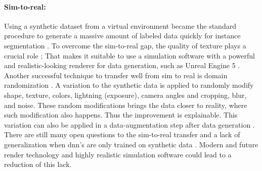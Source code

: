 		\paragraph{Sim-to-real:} Using a synthetic dataset from a virtual environment became the standard procedure to generate a massive amount of labeled data quickly for instance segmentation \cite{Danielczuk2019}\cite{Xie2020}\cite{Xie2021}\cite{Shao2018}\cite{Toda2019}. To overcome the sim-to-real gap, the quality of texture plays a crucial role \cite{Tabak2023}\cite{Martinez2019}; That makes it suitable to use a simulation software with a powerful and realistic-looking renderer for data generation, such as Unreal Engine 5 \cite{Romero2022}.\\
		Another successful technique to transfer well from sim to real is domain randomization \cite{Raj2023}. A variation to the synthetic data is applied to randomly modify shape, texture, colors, lightning (exposure), camera angles and cropping, blur, and noise. These random modifications brings the data closer to reality, where such modification also happens. Thus the improvement is explainable. This variation can also be applied in a data-augmentation step after data generation \cite{Kar2022}.\\
		There are still many open questions to the sim-to-real transfer and a lack of generalization when \ac{dnn}'s are only trained on synthetic data \cite{Doersch2019}. Modern and future render technology and highly realistic simulation software could lead to a reduction of this lack.
